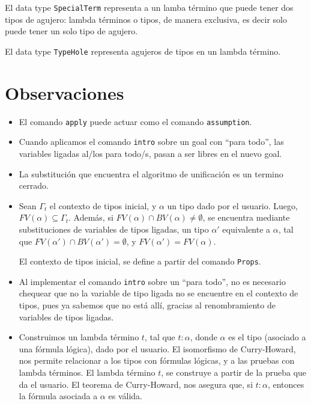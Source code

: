 \documentclass[a4paper,11pt]{article}
\begin{document}
El data type \texttt{SpecialTerm} representa a un lamba término que puede tener dos tipos de agujero: lambda términos o tipos, de manera
exclusiva, es decir solo puede tener un solo tipo de agujero.

El data type \texttt{TypeHole} representa agujeros de tipos en un lambda término.


\section{Observaciones}
\begin{itemize}
  \item El comando \texttt{apply} puede actuar como el comando \texttt{assumption}.
  \item Cuando aplicamos el comando \texttt{intro} sobre un goal con ``para todo'', las variables
  ligadas al/los para todo/s, pasan a ser libres en el nuevo goal. 
  \item La substitución que encuentra el algoritmo de unificación es un termino cerrado.
  \item Sean $\Gamma_{t}$ el contexto de tipos inicial, y $\alpha$ un tipo dado por el usuario. Luego, $FV(\alpha) \subseteq \Gamma_{t}$.
  Además, si $FV(\alpha) \cap BV(\alpha) \neq  \emptyset$, se encuentra mediante substituciones de variables de tipos ligadas, un tipo $\alpha'$ 
  equivalente a $\alpha$, tal que $FV(\alpha') \cap BV(\alpha') = \emptyset$, y $FV(\alpha') = FV(\alpha)$.
  
  El contexto de tipos inicial, se define a partir del comando \texttt{Props}.
  
  \item Al implementar el comando \texttt{intro} sobre un ``para todo'', no es necesario chequear que no la variable de tipo ligada no se encuentre
  en el contexto de tipos, pues ya sabemos que no está allí, gracias al renombramiento de variables de tipos ligadas.
  
  \item Construimos un lambda término $t$, tal que $t:\alpha$, donde $\alpha$ es el tipo (asociado a una fórmula lógica), dado por el usuario. El isomorfismo
  de Curry-Howard, nos permite relacionar a los tipos con fórmulas lógicas, y a las pruebas con lambda términos.
  El lambda término $t$, se construye a partir de la prueba que da el usuario.
  El teorema de Curry-Howard, nos asegura que, si $t:\alpha$, entonces la fórmula asociada a $\alpha$ es válida.
  

\end{itemize}
\end{document}
